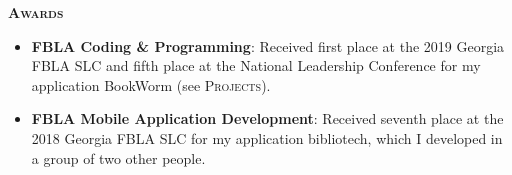 \documentclass{article}
\begin{document}
  \vspace{10pt}

  {\large \textbf{\textsc{Awards}}}\hspace{5pt}\xrfill[.5ex]{.4pt}

  \vspace{3pt}

  \begin{itemize}
    \item \textbf{FBLA Coding \& Programming}: Received first place at the 2019 Georgia FBLA SLC and fifth place at the National Leadership Conference for my application BookWorm (see \textsc{Projects}).
    \item \textbf{FBLA Mobile Application Development}: Received seventh place at the 2018 Georgia FBLA SLC for my application bibliotech, which I developed in a group of two other people.
  \end{itemize}

  \vspace{10pt}
\end{document}
